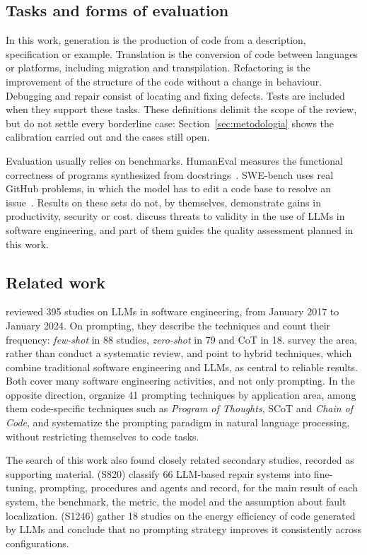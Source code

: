\subsection{Tasks and forms of evaluation}
In this work, generation is the production of code from a description, specification or example.
Translation is the conversion of code between languages or platforms, including migration and transpilation.
Refactoring is the improvement of the structure of the code without a change in behaviour. Debugging and repair
consist of locating and fixing defects. Tests are included when they support these tasks. These
definitions delimit the scope of the review, but do not settle every borderline case:
Section~\ref{sec:metodologia} shows the calibration carried out and the cases still open.

Evaluation usually relies on benchmarks. HumanEval measures the functional correctness of
programs synthesized from docstrings~\citep{chen2021codex}. SWE-bench uses
real GitHub problems, in which the model has to edit a code base to resolve an
issue~\citep{jimenez2024swebench}. Results on these sets do not, by themselves, demonstrate
gains in productivity, security or cost. \citet{sallou2024breaking} discuss
threats to validity in the use of LLMs in software engineering, and part of them guides the quality
assessment planned in this work.

\subsection{Related work}
\citet{hou2024slr} reviewed 395 studies on LLMs in software engineering, from January 2017 to
January 2024. On prompting, they describe the techniques and count their frequency: \textit{few-shot} in 88 studies,
\textit{zero-shot} in 79 and CoT in 18.
\citet{fan2023survey} survey the area, rather than conduct a systematic review, and point to hybrid
techniques, which combine traditional software engineering and LLMs, as central to reliable results.
Both cover many software engineering activities, and not only prompting.
In the opposite direction, \citet{sahoo2024survey} organize 41 prompting techniques by application area,
among them code-specific techniques such as \textit{Program of Thoughts}, SCoT and \textit{Chain of Code}, and
\citet{liu2021pretrain} systematize the prompting paradigm in natural language processing, without
restricting themselves to code tasks.

The search of this work also found closely related secondary studies, recorded as supporting material.
\citet{yang2025aprsurvey} (S820) classify 66 LLM-based repair systems into fine-tuning,
prompting, procedures and agents and record, for the main result of each system, the benchmark, the
metric, the model and the assumption about fault localization.
\citet{masthanali2026energy} (S1246) gather 18 studies on the energy efficiency of code
generated by LLMs and conclude that no prompting strategy improves it consistently across configurations.

